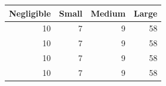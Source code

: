\begin{tabular}{rrrr}
\toprule
Negligible & Small & Medium & Large \\
\midrule
10 & 7 & 9 & 58 \\
10 & 7 & 9 & 58 \\
10 & 7 & 9 & 58 \\
10 & 7 & 9 & 58 \\
\bottomrule
\end{tabular}
